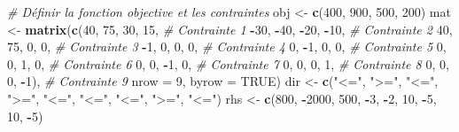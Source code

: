 \documentclass[
]{article}
\newenvironment{Shaded}{\begin{snugshade}}{\end{snugshade}}
\newcommand{\AttributeTok}[1]{\textcolor[rgb]{0.13,0.29,0.53}{#1}}
\newcommand{\CommentTok}[1]{\textcolor[rgb]{0.56,0.35,0.01}{\textit{#1}}}
\newcommand{\ConstantTok}[1]{\textcolor[rgb]{0.56,0.35,0.01}{#1}}
\newcommand{\DecValTok}[1]{\textcolor[rgb]{0.00,0.00,0.81}{#1}}
\newcommand{\FunctionTok}[1]{\textcolor[rgb]{0.13,0.29,0.53}{\textbf{#1}}}
\newcommand{\NormalTok}[1]{#1}
\newcommand{\OtherTok}[1]{\textcolor[rgb]{0.56,0.35,0.01}{#1}}
\newcommand{\SpecialCharTok}[1]{\textcolor[rgb]{0.81,0.36,0.00}{\textbf{#1}}}
\newcommand{\StringTok}[1]{\textcolor[rgb]{0.31,0.60,0.02}{#1}}
\begin{document}
\begin{Shaded}
\begin{Highlighting}[]
\CommentTok{\# Définir la fonction objective et les contraintes}
\NormalTok{obj }\OtherTok{\textless{}{-}} \FunctionTok{c}\NormalTok{(}\DecValTok{400}\NormalTok{, }\DecValTok{900}\NormalTok{, }\DecValTok{500}\NormalTok{, }\DecValTok{200}\NormalTok{)}
\NormalTok{mat }\OtherTok{\textless{}{-}} \FunctionTok{matrix}\NormalTok{(}\FunctionTok{c}\NormalTok{(}\DecValTok{40}\NormalTok{, }\DecValTok{75}\NormalTok{, }\DecValTok{30}\NormalTok{, }\DecValTok{15}\NormalTok{,   }\CommentTok{\# Contrainte 1}
                \SpecialCharTok{{-}}\DecValTok{30}\NormalTok{, }\SpecialCharTok{{-}}\DecValTok{40}\NormalTok{, }\SpecialCharTok{{-}}\DecValTok{20}\NormalTok{, }\SpecialCharTok{{-}}\DecValTok{10}\NormalTok{,   }\CommentTok{\# Contrainte 2}
                \DecValTok{40}\NormalTok{, }\DecValTok{75}\NormalTok{, }\DecValTok{0}\NormalTok{, }\DecValTok{0}\NormalTok{,   }\CommentTok{\# Contrainte 3}
                \SpecialCharTok{{-}}\DecValTok{1}\NormalTok{, }\DecValTok{0}\NormalTok{, }\DecValTok{0}\NormalTok{, }\DecValTok{0}\NormalTok{,   }\CommentTok{\# Contrainte 4}
                \DecValTok{0}\NormalTok{, }\SpecialCharTok{{-}}\DecValTok{1}\NormalTok{, }\DecValTok{0}\NormalTok{, }\DecValTok{0}\NormalTok{,   }\CommentTok{\# Contrainte 5}
                \DecValTok{0}\NormalTok{, }\DecValTok{0}\NormalTok{, }\DecValTok{1}\NormalTok{, }\DecValTok{0}\NormalTok{,   }\CommentTok{\# Contrainte 6}
                \DecValTok{0}\NormalTok{, }\DecValTok{0}\NormalTok{, }\SpecialCharTok{{-}}\DecValTok{1}\NormalTok{, }\DecValTok{0}\NormalTok{,  }\CommentTok{\# Contrainte 7}
                \DecValTok{0}\NormalTok{, }\DecValTok{0}\NormalTok{, }\DecValTok{0}\NormalTok{, }\DecValTok{1}\NormalTok{,   }\CommentTok{\# Contrainte 8}
                \DecValTok{0}\NormalTok{, }\DecValTok{0}\NormalTok{, }\DecValTok{0}\NormalTok{, }\SpecialCharTok{{-}}\DecValTok{1}\NormalTok{), }\CommentTok{\# Contrainte 9}
              \AttributeTok{nrow =} \DecValTok{9}\NormalTok{, }\AttributeTok{byrow =} \ConstantTok{TRUE}\NormalTok{)}
\NormalTok{dir }\OtherTok{\textless{}{-}} \FunctionTok{c}\NormalTok{(}\StringTok{"\textless{}="}\NormalTok{, }\StringTok{"\textgreater{}="}\NormalTok{, }\StringTok{"\textless{}="}\NormalTok{, }\StringTok{"\textgreater{}="}\NormalTok{, }\StringTok{"\textless{}="}\NormalTok{, }\StringTok{"\textless{}="}\NormalTok{, }\StringTok{"\textless{}="}\NormalTok{, }\StringTok{"\textgreater{}="}\NormalTok{, }\StringTok{"\textless{}="}\NormalTok{)}
\NormalTok{rhs }\OtherTok{\textless{}{-}} \FunctionTok{c}\NormalTok{(}\DecValTok{800}\NormalTok{, }\SpecialCharTok{{-}}\DecValTok{2000}\NormalTok{, }\DecValTok{500}\NormalTok{, }\SpecialCharTok{{-}}\DecValTok{3}\NormalTok{, }\SpecialCharTok{{-}}\DecValTok{2}\NormalTok{, }\DecValTok{10}\NormalTok{, }\SpecialCharTok{{-}}\DecValTok{5}\NormalTok{, }\DecValTok{10}\NormalTok{, }\SpecialCharTok{{-}}\DecValTok{5}\NormalTok{)}
\end{Highlighting}
\end{Shaded}
\end{document}

